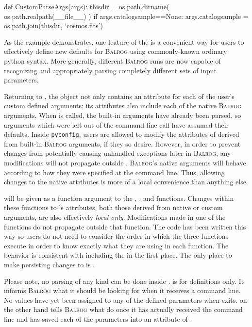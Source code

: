 \documentclass[11pt]{book}
\newcommand{\codett}[1]{\lstinline{#1}}
\newcommand{\pyconfig}{\codett{pyconfig}}
\newcommand{\balrog}{\textsc{Balrog}}
\begin{document}
\begin{code}
def CustomParseArgs(args):
    thisdir = os.path.dirname( os.path.realpath(__file__) )
    if args.catalogsample==None:
        args.catalogsample = os.path.join(thisdir, `cosmos.fits')
\end{code}

\noindent As the example demonstrates, one feature of the \parsefunc{} is a convenient
way for users to effectively define new defaults for \balrog{} using
commonly-known ordinary python syntax.
More generally, different \balrog{} runs are now capable of recognizing and appropriately parsing
completely different sets of input parameters. 

Returning to \parseargs{},
the object not only contains an attribute for each of the user's custom defined arguments;
its attributes also include each of the native \balrog{} arguments.
When \parsefunc{} is called, the built-in arguments have already been parsed,
so arguments which were left out of the command line call have assumed their defaults.
Inside \pyconfig{}, users are allowed to modify the attributes of \parseargs{} derived from built-in \balrog{} arguments, 
if they so desire.
However, in order to prevent changes from potentially causing unhandled exceptions later in \balrog{},
any modifications will not propagate outside \parsefunc{}.
\balrog{}'s native arguments will behave according to how they were specified at the command line.
Thus, allowing changes to the native attributes is more of a local convenience than anything else.

\parseargs{} will be given as a function argument to the \simfunc{}, \gspfunc, and \sexfunc{} functions.
Changes within these functions to \parseargs{}'s attributes, both those derived from native or custom arguments,
are also effectively \emph{local only}.
Modifications made in one of the functions do not propagate outside that function.
The code has been written this way so users do not need to consider the order in which the three functions execute
in order to know exactly what \parseargs{} they are using in each function.
The behavior is consistent with including the \parsefunc{} in the first place.
The only place to make persisting changes to \parseargs{} is \parsefunc{}.

Please note, no parsing of any kind can be done inside \argsfunc{}.
\argsfunc{} is for definitions only.
It informs \balrog{} what it should be looking for when it receives a command line.
No values have yet been assigned to any of the defined parameters when \argsfunc{} exits.
\parsefunc{} on the other hand tells \balrog{} what do once it has actually received the command line
and has saved each of the parameters into an attribute of \parseargs{}.
\end{document}
